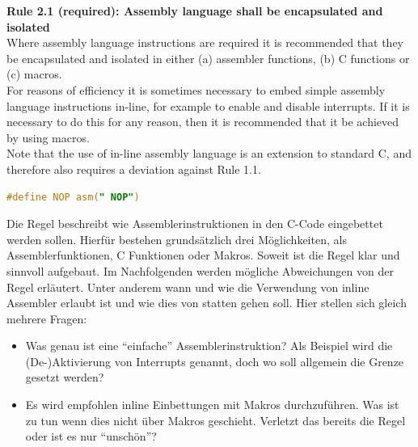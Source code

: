 \documentclass[a4paper,UKenglish,cleveref, autoref]{templates/lipics-v2019}
\begin{document}
    \noindent
    \begin{minipage}{\linewidth}
        \begin{example}
            \textbf{Rule 2.1 (required): Assembly language shall be encapsulated and isolated\cite{MISRA2004}}\\
            Where assembly language instructions are required it is recommended that they be encapsulated
            and isolated in either (a) assembler functions, (b) C functions or (c) macros.\\
            For reasons of efficiency it is sometimes necessary to embed simple assembly language instructions
            in-line, for example to enable and disable interrupts.
            If it is necessary to do this for any reason, then it is recommended that it be achieved by using macros.\\
            Note that the use of in-line assembly language is an extension to standard C, and therefore also
            requires a deviation against Rule 1.1.
            \begin{lstlisting}[language=C]
                #define NOP asm(" NOP")
            \end{lstlisting}
        \end{example}
    \end{minipage}

    Die Regel beschreibt wie Assemblerinstruktionen in den C-Code eingebettet werden sollen.
    Hierfür bestehen grundsätzlich drei Möglichkeiten, als Assemblerfunktionen, C Funktionen oder Makros.
    Soweit ist die Regel klar und sinnvoll aufgebaut.
    Im Nachfolgenden werden mögliche Abweichungen von der Regel erläutert.
    Unter anderem wann und wie die Verwendung von inline Assembler erlaubt ist und wie dies von statten gehen soll.
    Hier stellen sich gleich mehrere Fragen:

    \begin{itemize}
        \item Was genau ist eine \enquote{einfache} Assemblerinstruktion?
            Als Beispiel wird die (De-)Aktivierung von Interrupts genannt, doch wo soll allgemein die Grenze gesetzt werden?
        \item Es wird empfohlen inline Einbettungen mit Makros durchzuführen.
            Was ist zu tun wenn dies nicht über Makros geschieht.
            Verletzt das bereits die Regel oder ist es nur \enquote{unschön}?
    \end{itemize}
\end{document}
